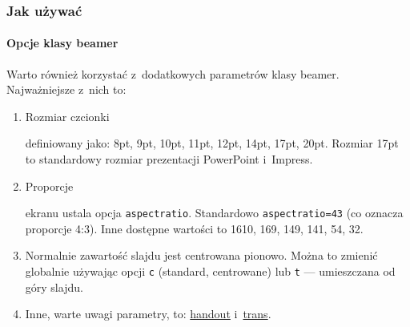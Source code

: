 \begin{frame}
 \frametitle<presentation>{Jak używać}
 \framesubtitle{Opcje klasy beamer}
 Warto również korzystać z~dodatkowych parametrów klasy beamer. Najważniejsze z~nich to:
 \begin{enumerate}
  \item
        \hypertarget{fontsize}{Rozmiar czcionki} definiowany jako:  \alert{8pt}, \alert{9pt}, 10pt, 11pt, 12pt, \alert{14pt}, \alert{17pt}, \alert{20pt}. Rozmiar 17pt to standardowy rozmiar prezentacji PowerPoint i~Impress.
  \item
        \hypertarget{proporcje}{Proporcje} ekranu ustala opcja \lstinline|aspectratio|. Standardowo \lstinline|aspectratio=43| (co oznacza proporcje 4:3). Inne dostępne wartości to 1610, 169, 149, 141, 54, 32.

  \item
        Normalnie zawartość slajdu jest centrowana pionowo. Można to zmienić globalnie używając opcji \lstinline|c| (standard, centrowane) lub \lstinline|t| — umieszczana od góry slajdu.
  \item
        Inne, warte uwagi parametry, to: \hyperlink{sec:handout}{handout} i~\hyperlink{sec:trans}{trans}.
 \end{enumerate}
\end{frame}

